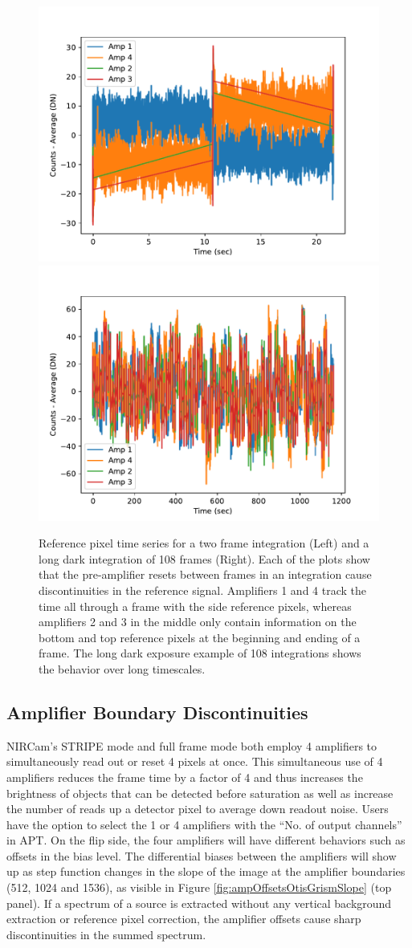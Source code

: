 \documentclass{aastex62}
\begin{document}
\begin{figure}[!hbtp]
\centering
\includegraphics[width=.49\columnwidth]{allamps.pdf}
\includegraphics[width=.49\columnwidth]{allamps_long_dark.pdf}
\caption{Reference pixel time series for a two frame integration (Left) and a long dark integration of 108 frames (Right). Each of the plots show that the pre-amplifier resets between frames in an integration cause discontinuities in the reference signal. Amplifiers 1 and 4 track the time all through a frame with the side reference pixels, whereas amplifiers 2 and 3 in the middle only contain information on the bottom and top reference pixels at the beginning and ending of a frame.
The long dark exposure example of 108 integrations shows the behavior over long timescales.}\label{fig:ampResetDark}
\end{figure}

\subsection{Amplifier Boundary Discontinuities}

NIRCam's STRIPE mode and full frame mode both employ 4 amplifiers to simultaneously read out or reset 4 pixels at once.
This simultaneous use of 4 amplifiers reduces the frame time by a factor of 4 and thus increases the brightness of objects that can be detected before saturation as well as increase the number of reads up a detector pixel to average down readout noise.
Users have the option to select the 1 or 4 amplifiers with the ``No. of output channels'' in APT.
On the flip side, the four amplifiers will have different behaviors such as offsets in the bias level.
The differential biases between the amplifiers will show up as step function changes in the slope of the image at the amplifier boundaries (512, 1024 and 1536), as visible in Figure \ref{fig:ampOffsetsOtisGrismSlope} (top panel).
If a spectrum of a source is extracted without any vertical background extraction or reference pixel correction, the amplifier offsets cause sharp discontinuities in the summed spectrum.
\end{document}
